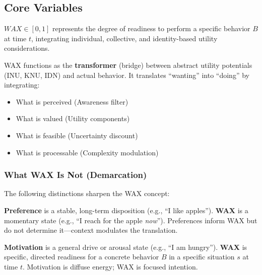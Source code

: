\subsection{Core Variables}

\begin{definition}
\label{def:wax}
$WAX \in [0,1]$ represents the degree of readiness to perform a specific behavior $B$ at time $t$, integrating individual, collective, and identity-based utility considerations.
\end{definition}


\begin{definition}
\label{def:wax-transformer}
WAX functions as the \textbf{transformer} (bridge) between abstract utility potentials (INU, KNU, IDN) and actual behavior. It translates ``wanting'' into ``doing'' by integrating:
\begin{itemize}
\item What is perceived (Awareness filter)
\item What is valued (Utility components)
\item What is feasible (Uncertainty discount)
\item What is processable (Complexity modulation)
\end{itemize}
\end{definition}

\subsubsection*{What WAX Is Not (Demarcation)}

The following distinctions sharpen the WAX concept:

\begin{definition}
\label{def:wax-not-preference}
\textbf{Preference} is a stable, long-term disposition (e.g., ``I like apples''). 
\textbf{WAX} is a momentary state (e.g., ``I reach for the apple \textit{now}'').
Preferences inform WAX but do not determine it---context modulates the translation.
\end{definition}

\begin{definition}
\label{def:wax-not-motivation}
\textbf{Motivation} is a general drive or arousal state (e.g., ``I am hungry'').
\textbf{WAX} is specific, directed readiness for a concrete behavior $B$ in a specific situation $s$ at time $t$.
Motivation is diffuse energy; WAX is focused intention.
\end{definition}

